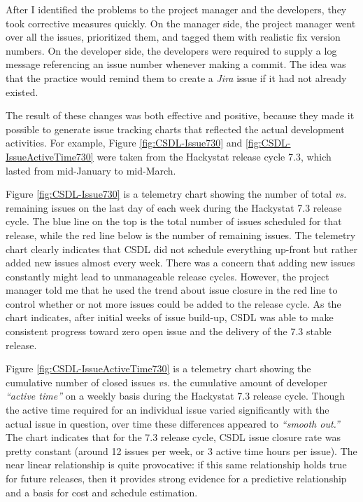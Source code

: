 After I identified the problems to the project manager and the developers, they took corrective measures quickly. On the manager side, the project manager went over all the issues, prioritized them, and tagged them with realistic fix version numbers. On the developer side,	the developers were required to supply a log message referencing an issue number whenever making a commit. The idea was that the practice would remind them to create a \textit{Jira} issue if it had not already existed.

The result of these changes was both effective and positive, because they made it possible to generate issue tracking charts that reflected the actual development activities. For example, Figure \ref{fig:CSDL-Issue730} and \ref{fig:CSDL-IssueActiveTime730} were taken from the Hackystat release cycle 7.3, which lasted from mid-January to mid-March.

Figure \ref{fig:CSDL-Issue730} is a telemetry chart showing the number of total \textit{vs.} remaining issues on the last day of each week during the Hackystat 7.3 release cycle. The blue line on the top is the total number of issues scheduled for that release, while the red line below is the number of remaining issues. The telemetry chart clearly indicates that CSDL did not schedule everything up-front but rather added new issues almost every week. There was a concern that adding new issues constantly might lead to unmanageable release cycles. However, the project manager told me that he used the trend about issue closure in the red line to control whether or not more issues could be added to the release cycle. As the chart indicates, after initial weeks of issue build-up, CSDL was able to make consistent progress toward zero open issue and the delivery of the 7.3 stable release.

Figure \ref{fig:CSDL-IssueActiveTime730} is a telemetry chart showing the cumulative number of closed issues \textit{vs.} the cumulative amount of developer \textit{``active time''} on a weekly basis during the Hackystat 7.3 release cycle. Though the active time required for an individual issue varied significantly with the actual issue in question, over time these differences appeared to \textit{``smooth out.''} The chart indicates that for the 7.3 release cycle, CSDL issue closure rate was pretty constant (around 12 issues per week, or 3 active time hours per issue). The near linear relationship is quite provocative: if this same relationship holds true for future releases, then it provides strong evidence for a predictive relationship and a basis for cost and schedule estimation.

